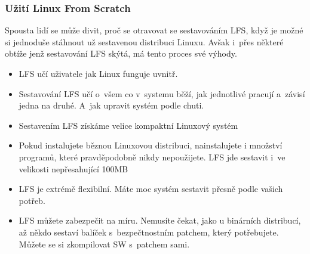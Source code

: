 \documentclass[a4paper,12pt]{article}
\begin{document}
\subsubsection{Užití Linux From Scratch}
Spousta lidí se může divit, proč se otravovat se sestavováním LFS, když je možné si jednoduše stáhnout už sestavenou distribuci Linuxu. Avšak i~přes některé obtíže jenž sestavování LFS skýtá, má tento proces své výhody.~\cite{LFS}
\begin{itemize}
 \item LFS učí uživatele jak Linux funguje uvnitř.
 \item Sestavování LFS učí o~všem co v~systemu běží, jak jednotlivé pracují a~závisí jedna na druhé. A~jak upravit systém podle chuti.
 \item Sestavením LFS získáme velice kompaktní Linuxový systém
 \item Pokud instalujete běznou Linuxovou distribuci, nainstalujete i množství programů, které pravděpodobně nikdy nepoužijete. LFS jde sestavit i~ve velikosti nepřesahující 100MB
\item LFS je extrémě flexibilní. Máte moc systém sestavit přesně podle vašich potřeb.
\item LFS můžete zabezpečit na míru. Nemusíte čekat, jako u binárních distribucí, až někdo sestaví balíček s~bezpečtnostním patchem, který potřebujete. Můžete se si zkompilovat SW s~patchem sami.
\end{itemize}
\end{document}
